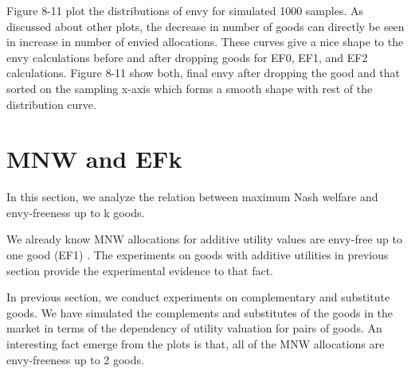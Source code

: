 

Figure 8-11 plot the distributions of envy for simulated 1000 samples. As discussed about other plots, the decrease in number of goods can directly be seen in increase in number of envied allocations. These curves give a nice shape to the envy calculations before and after dropping goods for EF0, EF1, and EF2 calculations. Figure 8-11 show both, final envy after dropping the good and that sorted on the sampling x-axis which forms a smooth shape with rest of the distribution curve.

\section{MNW and EFk}
In this section, we analyze the relation between maximum Nash welfare and envy-freeness up to k goods.

We already know MNW allocations for additive utility values are envy-free up to one good (EF1) \cite{caragiannis2016unreasonable}. The experiments on goods with additive utilities in previous section provide the experimental evidence to that fact.

In previous section, we conduct experiments on complementary and substitute goods. We have simulated the complements and substitutes of the goods in the market in terms of the dependency of utility valuation for pairs of goods. An interesting fact emerge from the plots is that, all of the MNW allocations are envy-freeness up to 2 goods.

